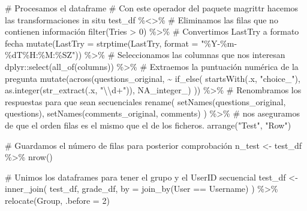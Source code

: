 \documentclass[
  12pt,
  a4paper,
  extrafontsizes,
  onecolumn,
  openright]{memoir}
\newenvironment{Shaded}{\begin{snugshade}}{\end{snugshade}}
\newcommand{\AttributeTok}[1]{\textcolor[rgb]{0.40,0.45,0.13}{#1}}
\newcommand{\CommentTok}[1]{\textcolor[rgb]{0.37,0.37,0.37}{#1}}
\newcommand{\ConstantTok}[1]{\textcolor[rgb]{0.56,0.35,0.01}{#1}}
\newcommand{\DecValTok}[1]{\textcolor[rgb]{0.68,0.00,0.00}{#1}}
\newcommand{\FunctionTok}[1]{\textcolor[rgb]{0.28,0.35,0.67}{#1}}
\newcommand{\NormalTok}[1]{\textcolor[rgb]{0.00,0.23,0.31}{#1}}
\newcommand{\OtherTok}[1]{\textcolor[rgb]{0.00,0.23,0.31}{#1}}
\newcommand{\SpecialCharTok}[1]{\textcolor[rgb]{0.37,0.37,0.37}{#1}}
\newcommand{\StringTok}[1]{\textcolor[rgb]{0.13,0.47,0.30}{#1}}
\begin{document}
\begin{Shaded}
\begin{Highlighting}[]
\CommentTok{\# Procesamos el dataframe}
\CommentTok{\# Con este operador del paquete magrittr hacemos las transformaciones in situ}
\NormalTok{test\_df }\SpecialCharTok{\%\textless{}\textgreater{}\%} 
    \CommentTok{\# Eliminamos las filas que no contienen información}
    \FunctionTok{filter}\NormalTok{(Tries }\SpecialCharTok{\textgreater{}} \DecValTok{0}\NormalTok{) }\SpecialCharTok{\%\textgreater{}\%} 
    \CommentTok{\# Convertimos LastTry a formato fecha}
    \FunctionTok{mutate}\NormalTok{(}\AttributeTok{LastTry =} \FunctionTok{strptime}\NormalTok{(LastTry, }\AttributeTok{format =} \StringTok{"\%Y{-}\%m{-}\%dT\%H:\%M:\%SZ"}\NormalTok{)) }\SpecialCharTok{\%\textgreater{}\%} 
    \CommentTok{\# Seleccionamos las columnas que nos interesan}
\NormalTok{    dplyr}\SpecialCharTok{::}\FunctionTok{select}\NormalTok{(}\FunctionTok{all\_of}\NormalTok{(columns)) }\SpecialCharTok{\%\textgreater{}\%} 
    \CommentTok{\# Extraemos la puntuación numérica de la pregunta}
    \FunctionTok{mutate}\NormalTok{(}\FunctionTok{across}\NormalTok{(questions\_original, }\SpecialCharTok{\textasciitilde{}} \FunctionTok{if\_else}\NormalTok{(}
        \FunctionTok{startsWith}\NormalTok{(.x, }\StringTok{"choice\_"}\NormalTok{), }\FunctionTok{as.integer}\NormalTok{(}\FunctionTok{str\_extract}\NormalTok{(.x, }\StringTok{"}\SpecialCharTok{\textbackslash{}\textbackslash{}}\StringTok{d+"}\NormalTok{)), }\ConstantTok{NA\_integer\_}\NormalTok{)}
\NormalTok{    )) }\SpecialCharTok{\%\textgreater{}\%}
    \CommentTok{\# Renombramos los respuestas para que sean secuenciales}
    \FunctionTok{rename}\NormalTok{(}
        \FunctionTok{setNames}\NormalTok{(questions\_original, questions),}
        \FunctionTok{setNames}\NormalTok{(comments\_original, comments)}
\NormalTok{    ) }\SpecialCharTok{\%\textgreater{}\%}
    \CommentTok{\# nos aseguramos de que el orden filas es el mismo que el de los ficheros.}
    \FunctionTok{arrange}\NormalTok{(}\StringTok{"Test"}\NormalTok{, }\StringTok{"Row"}\NormalTok{) }

\CommentTok{\# Guardamos el número de filas para posterior comprobación}
\NormalTok{n\_test }\OtherTok{\textless{}{-}}\NormalTok{ test\_df }\SpecialCharTok{\%\textgreater{}\%} \FunctionTok{nrow}\NormalTok{()}

\CommentTok{\# Unimos los dataframes para tener el grupo y el UserID secuencial}
\NormalTok{test\_df }\OtherTok{\textless{}{-}} \FunctionTok{inner\_join}\NormalTok{(}
\NormalTok{    test\_df, grade\_df, }\AttributeTok{by =} \FunctionTok{join\_by}\NormalTok{(User }\SpecialCharTok{==}\NormalTok{ Username)}
\NormalTok{    ) }\SpecialCharTok{\%\textgreater{}\%} \FunctionTok{relocate}\NormalTok{(Group, }\AttributeTok{.before =} \DecValTok{2}\NormalTok{)}


\end{Highlighting}
\end{Shaded}
\end{document}

